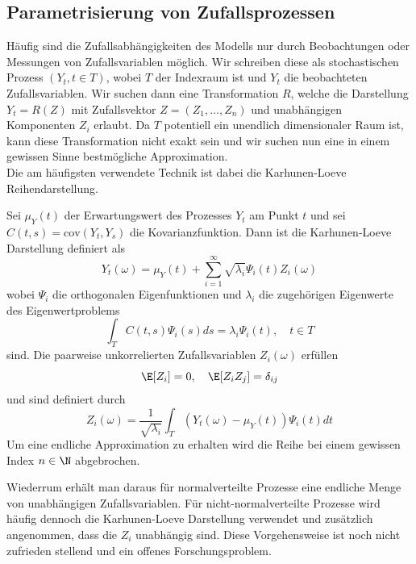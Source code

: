 \subsection{Parametrisierung von Zufallsprozessen}
Häufig sind die Zufallsabhängigkeiten des Modells nur durch Beobachtungen oder Messungen von Zufallsvariablen möglich. Wir schreiben diese als stochastischen Prozess $(Y_t,t\in T)$, wobei $T$ der Indexraum ist und $Y_t$ die beobachteten Zufallsvariablen. Wir suchen dann eine Transformation $R$, welche die Darstellung $Y_t=R(Z)$ mit Zufallsvektor $Z=(Z_1,\dots,Z_n)$ und unabhängigen Komponenten $Z_i$ erlaubt. Da $T$ potentiell ein unendlich dimensionaler Raum ist, kann diese Transformation nicht exakt sein und wir suchen nun eine in einem gewissen Sinne bestmögliche Approximation.\\
Die am häufigsten verwendete Technik ist dabei die Karhunen-Loeve Reihendarstellung.
\begin{mathdef}
Sei $\mu_Y(t)$ der Erwartungswert des Prozesses $Y_t$ am Punkt $t$ und sei $C(t,s)=\text{cov}(Y_t,Y_s)$ die Kovarianzfunktion. Dann ist die Karhunen-Loeve Darstellung definiert als
\[Y_t(\omega)=\mu_Y(t)+\sum_{i=1}^\infty \sqrt{\lambda_i}\Psi_i(t)Z_i(\omega)\] wobei $\Psi_i$ die orthogonalen Eigenfunktionen und $\lambda_i$ die zugehörigen Eigenwerte des Eigenwertproblems
\[\int_T C(t,s)\Psi_i(s)ds=\lambda_i\Psi_i(t),\quad t\in T\]
sind. Die paarweise unkorrelierten Zufallsvariablen $Z_i(\omega)$ erfüllen
\[\E[Z_i]=0,\quad \E[Z_iZ_j]=\delta_{ij}\]
und sind definiert durch
\[Z_i(\omega)=\frac{1}{\sqrt{\lambda_i}}\int_T (Y_t(\omega)-\mu_Y(t))\Psi_i(t)dt\]
Um eine endliche Approximation zu erhalten wird die Reihe bei einem gewissen Index $n\in\N$ abgebrochen.
\end{mathdef}
Wiederrum erhält man daraus für normalverteilte Prozesse eine endliche Menge von unabhängigen Zufallsvariablen. Für nicht-normalverteilte Prozesse wird häufig dennoch die Karhunen-Loeve Darstellung verwendet und zusätzlich angenommen, dass die $Z_i$ unabhängig sind. Diese Vorgehensweise ist noch nicht zufrieden stellend und ein offenes Forschungsproblem.

